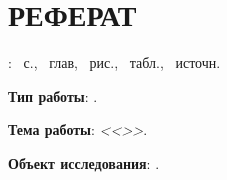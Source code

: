 \chapter*{РЕФЕРАТ}
\doctype\xspace: ~с., ~глав, ~рис., ~табл., ~источн.%

\vspace{3mm}


\Preface

\textbf{Тип работы}: \doctype.

\textbf{Тема работы}: \textit{<<\Title>>}.

\textbf{Объект исследования}: \ObjectOfResearch.


